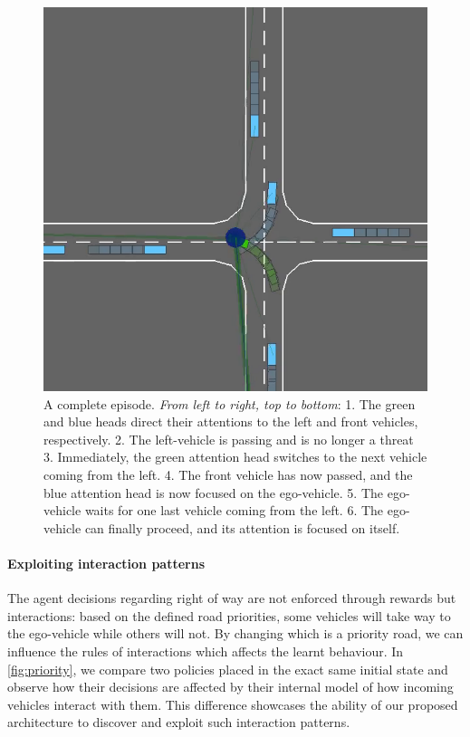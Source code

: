 \documentclass{article}
\begin{document}
\begin{figure}[tp]
		\includegraphics[width=.32\linewidth]{img/episode6}
	\caption{A complete episode. \emph{From left to right, top to bottom}: 1. The green and blue heads direct their attentions to the left and front vehicles, respectively. 2. The left-vehicle is passing and is no longer a threat 3. Immediately, the green attention head switches to the next vehicle coming from the left. 4. The front vehicle has now passed, and the blue attention head is now focused on the ego-vehicle. 5. The ego-vehicle waits for one last vehicle coming from the left. 6. The ego-vehicle can finally proceed, and its attention is focused on itself.}
	\label{fig:episode}
\end{figure}

\paragraph{Exploiting interaction patterns}

The agent decisions regarding right of way are not enforced through rewards but interactions: based on the defined road priorities, some vehicles will take way to the ego-vehicle while others will not. By changing which is a priority road, we can influence the rules of interactions which affects the learnt behaviour. In \autoref{fig:priority}, we compare two policies placed in the exact same initial state and observe how their decisions are affected by their internal model of how incoming vehicles interact with them. This difference showcases the ability of our proposed architecture to discover and exploit such interaction patterns.
\end{document}
